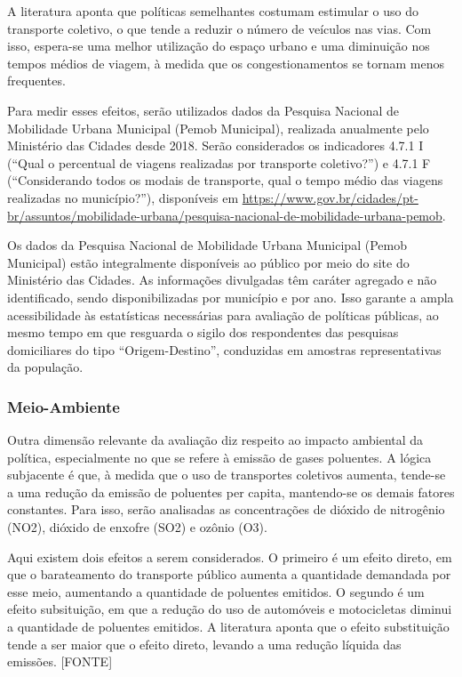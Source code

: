 A literatura aponta que políticas semelhantes costumam estimular o uso do transporte coletivo, o que tende a reduzir o número de veículos nas vias. Com isso, espera-se uma melhor utilização do espaço urbano e uma diminuição nos tempos médios de viagem, à medida que os congestionamentos se tornam menos frequentes.

Para medir esses efeitos, serão utilizados dados da Pesquisa Nacional de Mobilidade Urbana Municipal (Pemob Municipal), realizada anualmente pelo Ministério das Cidades desde 2018. Serão considerados os indicadores 4.7.1 I (“Qual o percentual de viagens realizadas por transporte coletivo?”) e 4.7.1 F (“Considerando todos os modais de transporte, qual o tempo médio das viagens realizadas no município?”), disponíveis em \url{https://www.gov.br/cidades/pt-br/assuntos/mobilidade-urbana/pesquisa-nacional-de-mobilidade-urbana-pemob}.

Os dados da Pesquisa Nacional de Mobilidade Urbana Municipal (Pemob Municipal) estão integralmente disponíveis ao público por meio do site do Ministério das Cidades. As informações divulgadas têm caráter agregado e não identificado, sendo disponibilizadas por município e por ano. Isso garante a ampla acessibilidade às estatísticas necessárias para avaliação de políticas públicas, ao mesmo tempo em que resguarda o sigilo dos respondentes das pesquisas domiciliares do tipo “Origem-Destino”, conduzidas em amostras representativas da população.

\subsubsection{Meio-Ambiente}
Outra dimensão relevante da avaliação diz respeito ao impacto ambiental da política, especialmente no que se refere à emissão de gases poluentes. A lógica subjacente é que, à medida que o uso de transportes coletivos aumenta, tende-se a uma redução da emissão de poluentes per capita, mantendo-se os demais fatores constantes. Para isso, serão analisadas as concentrações de dióxido de nitrogênio (NO2), dióxido de enxofre (SO2) e ozônio (O3).

Aqui existem dois efeitos a serem considerados. O primeiro é um efeito direto, em que o barateamento do transporte público aumenta a quantidade demandada por esse meio, aumentando a quantidade de poluentes emitidos. O segundo é um efeito subsituição, em que a redução do uso de automóveis e motocicletas diminui a quantidade de poluentes emitidos. A literatura aponta que o efeito substituição tende a ser maior que o efeito direto, levando a uma redução líquida das emissões. [FONTE]

